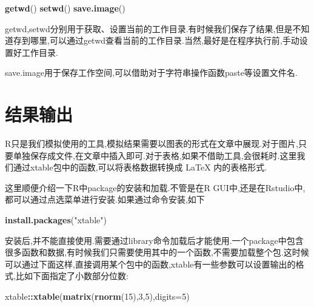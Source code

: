 \documentclass[]{ctexbook}
\newenvironment{Shaded}{\begin{snugshade}}{\end{snugshade}}
\newcommand{\DataTypeTok}[1]{\textcolor[rgb]{0.13,0.29,0.53}{#1}}
\newcommand{\DecValTok}[1]{\textcolor[rgb]{0.00,0.00,0.81}{#1}}
\newcommand{\KeywordTok}[1]{\textcolor[rgb]{0.13,0.29,0.53}{\textbf{#1}}}
\newcommand{\NormalTok}[1]{#1}
\newcommand{\OperatorTok}[1]{\textcolor[rgb]{0.81,0.36,0.00}{\textbf{#1}}}
\newcommand{\StringTok}[1]{\textcolor[rgb]{0.31,0.60,0.02}{#1}}
\begin{document}
\begin{Shaded}
\begin{Highlighting}[]
\KeywordTok{getwd}\NormalTok{()}
\KeywordTok{setwd}\NormalTok{()}
\KeywordTok{save.image}\NormalTok{()}
\end{Highlighting}
\end{Shaded}

getwd,setwd分别用于获取、设置当前的工作目录.有时候我们保存了结果,但是不知道存到哪里,可以通过getwd查看当前的工作目录.当然,最好是在程序执行前,手动设置好工作目录.

save.image用于保存工作空间,可以借助对于字符串操作函数paste等设置文件名.

\hypertarget{section-7}{%
\section{结果输出}\label{section-7}}

R只是我们模拟使用的工具,模拟结果需要以图表的形式在文章中展现.对于图片,只要单独保存成文件,在文章中插入即可.对于表格,如果不借助工具,会很耗时.这里我们通过xtable包中的函数,可以将表格数据转换成 LaTeX 内的表格形式.

这里顺便介绍一下R中package的安装和加载.不管是在R GUI中,还是在Rstudio中,都可以通过点选菜单进行安装.如果通过命令安装,如下

\begin{Shaded}
\begin{Highlighting}[]
\KeywordTok{install.packages}\NormalTok{(}\StringTok{"xtable"}\NormalTok{)}
\end{Highlighting}
\end{Shaded}

安装后,并不能直接使用.需要通过library命令加载后才能使用.一个package中包含很多函数和数据,有时候我们只需要使用其中的一个函数,不需要加载整个包.这时候可以通过下面这样,直接调用某个包中的函数,xtable有一些参数可以设置输出的格式,比如下面指定了小数部分位数:

\begin{Shaded}
\begin{Highlighting}[]
\NormalTok{xtable}\OperatorTok{::}\KeywordTok{xtable}\NormalTok{(}\KeywordTok{matrix}\NormalTok{(}\KeywordTok{rnorm}\NormalTok{(}\DecValTok{15}\NormalTok{),}\DecValTok{3}\NormalTok{,}\DecValTok{5}\NormalTok{),}\DataTypeTok{digits=}\DecValTok{5}\NormalTok{)}
\end{Highlighting}
\end{Shaded}
\end{document}
